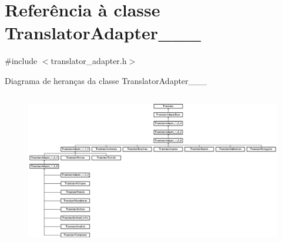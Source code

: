 \hypertarget{class_translator_adapter__1__8__0}{\section{Referência à classe Translator\-Adapter\-\_\-\_\-\_}
\label{class_translator_adapter__1__8__0}
}


{\ttfamily \#include $<$translator\-\_\-adapter.\-h$>$}

Diagrama de heranças da classe Translator\-Adapter\-\_\-\_\-\_\begin{figure}[H]
\begin{center}
\leavevmode
\includegraphics[height=6.829268cm]{class_translator_adapter__1__8__0}
\end{center}
\end{figure}
